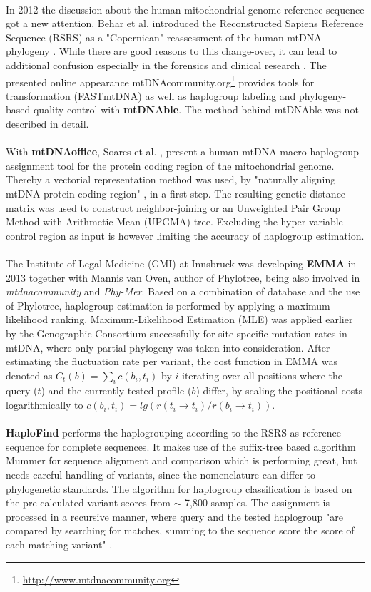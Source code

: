 \\
In 2012 the discussion about the human mitochondrial genome reference sequence got a new attention. Behar et al. introduced the Reconstructed Sapiens Reference Sequence (RSRS) as a "Copernican" reassessment of the human mtDNA phylogeny \cite{Behar2012}. While there are good reasons to this change-over, it can lead to additional confusion especially in the forensics and clinical research \cite{Bandelt2013}. The presented online appearance mtDNAcommunity.org\footnote{\url{http://www.mtdnacommunity.org}} provides tools for transformation (FASTmtDNA) as well as haplogroup labeling and phylogeny-based quality control with \textbf{mtDNAble}. The method behind mtDNAble was not described in detail.\\
\\
With \textbf{mtDNAoffice}, Soares et al. \cite{Soares2012}, present a human mtDNA macro haplogroup assignment tool for the protein coding region of the mitochondrial genome. Thereby a vectorial representation method was used, by "naturally aligning mtDNA protein-coding region" \cite{Soares2012}, in a first step. The resulting genetic distance matrix was used to construct neighbor-joining or an Unweighted Pair Group Method with Arithmetic Mean (UPGMA) tree. Excluding the hyper-variable control region as input is however limiting the accuracy of haplogroup estimation.\\
\\
The Institute of Legal Medicine (GMI) at Innsbruck was developing \textbf{EMMA} in 2013 together with Mannis van Oven, author of Phylotree, being also involved in \textit{mtdnacommunity} and \textit{Phy-Mer}. Based on a combination of database and the use of Phylotree, haplogroup estimation is performed by applying a maximum likelihood ranking. Maximum-Likelihood Estimation (MLE) was applied earlier by the Genographic Consortium \cite{Rosset2008} successfully for site-specific mutation rates in mtDNA, where only partial phylogeny was taken into consideration. After estimating the fluctuation rate per variant, the cost function in EMMA was denoted as $C_t(b) = \sum_i{c(b_i,t_i)}$ by $i$ iterating over all positions where the query ($t$) and the currently tested profile ($b$) differ, by scaling the positional costs logarithmically to  $c(b_i,t_i)= lg(r(t_i \rightarrow t_i)/r(b_i \rightarrow t_i))$. \\
\\
\textbf{HaploFind} performs the haplogrouping according to the RSRS as reference sequence for complete sequences. It makes use of the suffix-tree based algorithm Mummer for sequence alignment and comparison which is performing great, but needs careful handling of variants, since the nomenclature can differ to phylogenetic standards. The algorithm for haplogroup classification is based on the pre-calculated variant scores from $\sim$ 7,800 samples. The assignment is processed in a recursive manner, where query and the tested haplogroup "are compared by searching for matches, summing to the sequence score the score of each matching variant" \cite{Vianello2013}.\\
